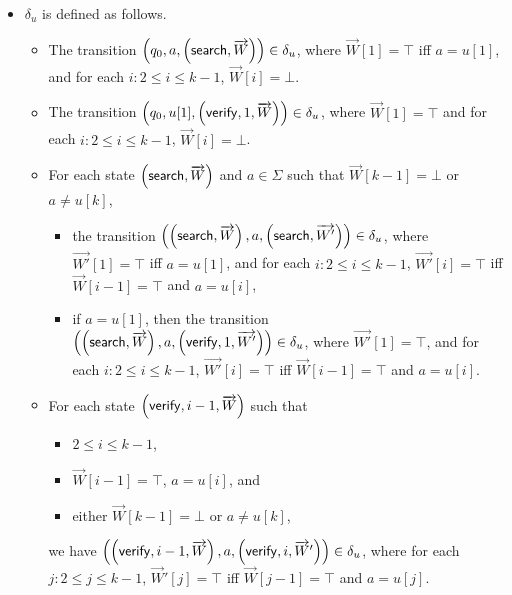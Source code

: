 \begin{definition}
\begin{itemize}
	\item $\delta_{u}$ is defined as follows.
	\begin{itemize}
		\item The transition $\left(q_0, a, \left(\mathsf{search}, \overrightarrow{W}\right)\right) \in \delta_u$, where $\overrightarrow{W}[1]=\top$ iff $a = u[1]$, and for each $i: 2 \le i \le k-1$, $\overrightarrow{W}[i] = \bot$.
		\item The transition $\left(q_0, u[1], \left(\mathsf{verify}, 1, \overrightarrow{W}\right)\right) \in \delta_u$, where $\overrightarrow{W}[1]=\top$ and for each $i: 2 \le i \le k-1$, $\overrightarrow{W}[i] = \bot$.
%
		\item For each state $\left(\mathsf{search}, \overrightarrow{W} \right)$ and $a \in \Sigma$ such that $\overrightarrow{W}[k-1] = \bot$ or $a \neq u[k]$,
		\begin{itemize}
			\item the transition $\left(\left(\mathsf{search}, \overrightarrow{W} \right), a, \left(\mathsf{search}, \overrightarrow{W'} \right)\right) \in \delta_u$, where $\overrightarrow{W'}[1] = \top$ iff $a = u[1]$, and for each $i: 2 \le i \le k-1$, $\overrightarrow{W'}[i] =\top$ iff $\overrightarrow{W}[{i-1}] = \top$ and $a = u[i]$,
			\item if $a = u[1]$, then the transition $\left(\left(\mathsf{search}, \overrightarrow{W} \right), a, \left(\mathsf{verify}, 1, \overrightarrow{W'} \right)\right) \in \delta_u$, where $\overrightarrow{W'}[1]=\top$,  and for each $i: 2 \le i \le k-1$, $\overrightarrow{W'}[i] =\top$ iff $\overrightarrow{W}[{i-1}] = \top$ and $a = u[i]$.
		\end{itemize}
		\item For each state $\left(\mathsf{verify}, i-1, \overrightarrow{W} \right)$ such that 
		\begin{itemize}
			\item $2 \le i \le k-1$,
			\item $\overrightarrow{W}[i-1]=\top$, $a = u[i]$, and
			\item either $\overrightarrow{W}[k-1]=\bot$ or $a \neq u[k]$, 
		\end{itemize}
		we have $\left(\left(\mathsf{verify}, i-1, \overrightarrow{W} \right), a, \left(\mathsf{verify}, i, \overrightarrow{W}' \right)\right) \in \delta_u$, where for each $j: 2 \le j \le k-1$, $\overrightarrow{W}'[j] = \top$ iff $\overrightarrow{W}[j-1]=\top$ and $a = u[j]$.

\end{itemize}
\end{itemize}
\end{definition}
